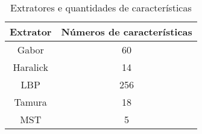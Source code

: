\begin{table}[H]
    \centering
    \caption[Extratores e quantidades de características]{Extratores e quantidades de características
    \label{tab:extratorXqtdCaracteristicas}}
    \begin{tabular}{cc}
        \toprule
            Extrator & Números de características \\
        \midrule
            Gabor & 60 \\
            Haralick & 14 \\
            LBP & 256 \\
            Tamura & 18 \\
            MST & 5 \\
        \bottomrule
    \end{tabular}
\end{table}
